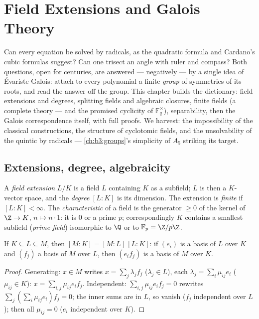 \chapter{Field Extensions and Galois Theory}\label{ch:b3:galois}

Can every equation be solved by radicals, as the quadratic formula
and Cardano's cubic formulas suggest? Can one trisect an angle
with ruler and compass? Both questions, open for centuries, are
answered --- negatively --- by a single idea of \'Evariste Galois:
attach to every polynomial a finite \emph{group} of symmetries of
its roots, and read the answer off the group. This chapter builds
the dictionary: field extensions and degrees, splitting fields and
algebraic closures, finite fields (a complete theory --- and the
promised cyclicity of $\mathbb F_q^\times$), separability, then
the Galois correspondence itself, with full proofs. We harvest:
the impossibility of the classical constructions, the structure of
cyclotomic fields, and the unsolvability of the quintic by
radicals --- \cref{ch:b3:groups}'s simplicity of $A_5$ striking
its target.

\section{Extensions, degree, algebraicity}

\begin{definition}\label{def:b3:galois:extension}
A \emph{field extension} $L/K$ is a field
$L$ containing $K$ as a subfield; $L$ is then a $K$-vector space,
and the \emph{degree} $[L:K]$ is
its dimension. The extension is \emph{finite} if $[L:K] <
\infty$. The \emph{characteristic} of a field is the generator
$\geq 0$ of the kernel of $\Z \to K$, $n \mapsto n\cdot 1$: it is
$0$ or a prime $p$; correspondingly $K$ contains a smallest
subfield (\emph{prime field}) isomorphic to $\Q$ or to $\mathbb
F_p = \Z/p\Z$.
\end{definition}

\begin{theorem}\label{thm:b3:galois:tower}
If $K \subseteq L \subseteq M$, then $[M:K] = [M:L]\,[L:K]$: if
$(e_i)$ is a basis of $L$ over $K$ and $(f_j)$ a basis of $M$
over $L$, then $(e_if_j)$ is a basis of $M$ over
$K$.
\end{theorem}

\begin{proof}
Generating: $x \in M$ writes $x = \sum_j \lambda_jf_j$
($\lambda_j \in L$), each $\lambda_j = \sum_i \mu_{ij}e_i$
($\mu_{ij} \in K$): $x = \sum_{i,j}\mu_{ij}e_if_j$. Independent:
$\sum_{i,j}\mu_{ij}e_if_j = 0$ rewrites $\sum_j (\sum_i
\mu_{ij}e_i)f_j = 0$; the inner sums are in $L$, so vanish
($f_j$ independent over $L$); then all $\mu_{ij} = 0$ ($e_i$
independent over $K$).
\end{proof}

